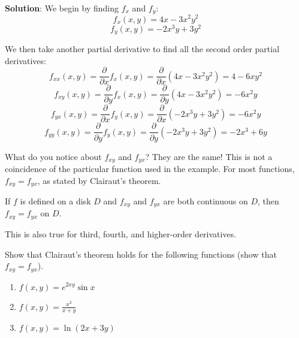 \textbf{Solution}: We begin by finding $f_x$ and $f_y$:
$$f_x(x, y) = 4x - 3x^2y^2$$
$$f_y(x, y) = -2x^3y + 3y^2$$

We then take another partial derivative to find all the second order partial 
derivatives:
$$f_{xx}(x, y) = \frac{\partial}{\partial x}f_x(x, y) = \frac{\partial}{
\partial x} \left( 4x - 3x^2y^2 \right) = 4 - 6xy^2$$
$$f_{xy}(x, y) = \frac{\partial}{\partial y}f_x(x, y) = \frac{\partial}{
\partial y} \left( 4x - 3x^2y^2 \right) = -6x^2y$$
$$f_{yx}(x, y) = \frac{\partial}{\partial x}f_y(x, y) = \frac{\partial}{
\partial x} \left( -2x^3y + 3y^2 \right) = -6x^2y$$
$$f_{yy}(x, y) = \frac{\partial}{\partial y}f_y(x, y) = \frac{\partial}{
\partial y} \left( -2x^3y + 3y^2 \right) = -2x^3 + 6y$$

What do you notice about $f_{xy}$ and $f_{yx}$? They are the same! This is not 
a coincidence of the particular function used in the example. For most 
functions, $f_{xy} = f_{yx}$, as stated by Clairaut's theorem.

\begin{mdframed}[style = important, frametitle = {Clairaut's Theorem}]
If $f$ is defined on a disk $D$ and $f_{xy}$ and $f_{yx}$ are both continuous 
on $D$, then $f_{xy} = f_{yx}$ on $D$.
\end{mdframed}

This is also true for third, fourth, and higher-order derivatives. 

\begin{Exercise}[title = {Clairaut's Theorem}, label = clairaut]
Show that Clairaut's theorem holds for the following functions (show that 
$f_{xy} = f_{yx}$). 
\begin{enumerate}
    \item $f(x, y) = e^{2xy} \sin{x}$
    \item $f(x, y) = \frac{x^2}{x + y}$
    \item $f(x, y) = \ln{\left( 2x + 3y \right)}$
\end{enumerate}
\vspace{70mm}
\end{Exercise}

